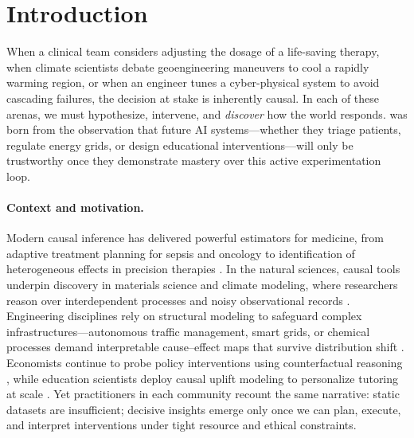 \section{Introduction}
When a clinical team considers adjusting the dosage of a life-saving therapy, when climate scientists debate geoengineering maneuvers to cool a rapidly warming region, or when an engineer tunes a cyber-physical system to avoid cascading failures, the decision at stake is inherently causal. In each of these arenas, we must hypothesize, intervene, and \emph{discover} how the world responds. \game was born from the observation that future AI systems—whether they triage patients, regulate energy grids, or design educational interventions—will only be trustworthy once they demonstrate mastery over this active experimentation loop.

\paragraph{Context and motivation.}
Modern causal inference has delivered powerful estimators for medicine, from adaptive treatment planning for sepsis and oncology \citep{Shi2022LearningCEA,Smith2023ApplicationOTA,Prosperi2020CausalIAA} to identification of heterogeneous effects in precision therapies \citep{Cai2017IdentificationOAA}. In the natural sciences, causal tools underpin discovery in materials science and climate modeling, where researchers reason over interdependent processes and noisy observational records \citep{Varghese2024CausalDTA,Zucker2021LeveragingSBA,runge2019causality}. Engineering disciplines rely on structural modeling to safeguard complex infrastructures—autonomous traffic management, smart grids, or chemical processes demand interpretable cause–effect maps that survive distribution shift \citep{Chadbourne2023ApplicationsOCA,Li2024InferringHTA,Graham2022CausalIFA}. Economists continue to probe policy interventions using counterfactual reasoning \citep{Athey2016TheSOA,lalonde1986evaluating,Abbring2025PhilipGWA}, while education scientists deploy causal uplift modeling to personalize tutoring at scale \citep{Nagai2024EducationalEIA,Chi2022APGA,weissman2021methods}. Yet practitioners in each community recount the same narrative: static datasets are insufficient; decisive insights emerge only once we can plan, execute, and interpret interventions under tight resource and ethical constraints.

